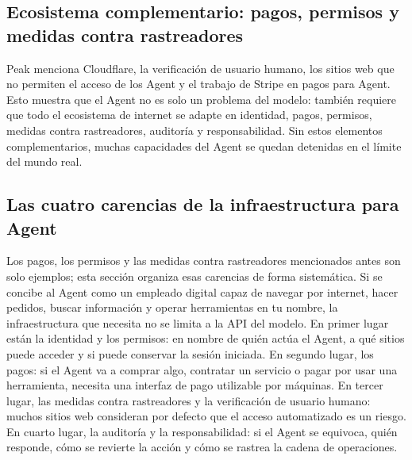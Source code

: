 \subsection{Ecosistema complementario: pagos, permisos y medidas contra rastreadores}

Peak menciona Cloudflare, la verificación de usuario humano, los sitios web que no permiten el acceso de los Agent y el trabajo de Stripe en pagos para Agent. Esto muestra que el Agent no es solo un problema del modelo: también requiere que todo el ecosistema de internet se adapte en identidad, pagos, permisos, medidas contra rastreadores, auditoría y responsabilidad. Sin estos elementos complementarios, muchas capacidades del Agent se quedan detenidas en el límite del mundo real.

\subsection{Las cuatro carencias de la infraestructura para Agent}

Los pagos, los permisos y las medidas contra rastreadores mencionados antes son solo ejemplos; esta sección organiza esas carencias de forma sistemática. Si se concibe al Agent como un empleado digital capaz de navegar por internet, hacer pedidos, buscar información y operar herramientas en tu nombre, la infraestructura que necesita no se limita a la API del modelo. En primer lugar están la identidad y los permisos: en nombre de quién actúa el Agent, a qué sitios puede acceder y si puede conservar la sesión iniciada. En segundo lugar, los pagos: si el Agent va a comprar algo, contratar un servicio o pagar por usar una herramienta, necesita una interfaz de pago utilizable por máquinas. En tercer lugar, las medidas contra rastreadores y la verificación de usuario humano: muchos sitios web consideran por defecto que el acceso automatizado es un riesgo. En cuarto lugar, la auditoría y la responsabilidad: si el Agent se equivoca, quién responde, cómo se revierte la acción y cómo se rastrea la cadena de operaciones.

